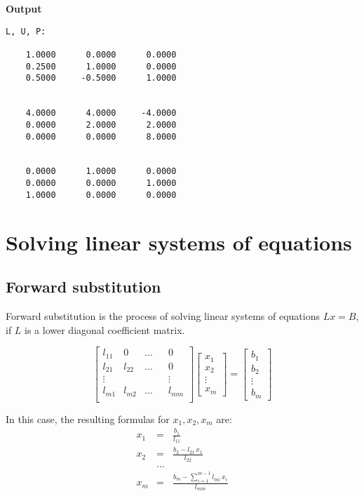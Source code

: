 \hsep
{\bf Output}
\begin{verbatim}
L, U, P:

    1.0000      0.0000      0.0000  
    0.2500      1.0000      0.0000  
    0.5000     -0.5000      1.0000  


    4.0000      4.0000     -4.0000  
    0.0000      2.0000      2.0000  
    0.0000      0.0000      8.0000  


    0.0000      1.0000      0.0000  
    0.0000      0.0000      1.0000  
    1.0000      0.0000      0.0000  
\end{verbatim}

\section{Solving linear systems of equations}

\subsection{Forward substitution}

Forward substitution is the process of solving linear systems of equations $Lx=B$, if $L$ is a lower diagonal coefficient matrix.

$$
\begin{bmatrix}
l_{11} & 0 & \ldots && 0\\
l_{21} & l_{22} & \ldots && 0\\
\vdots & & & & \vdots \\
l_{m1} & l_{m2} & \ldots && l_{mm}\\
\end{bmatrix}
\begin{bmatrix}
x_{1} \\
x_{2} \\
\vdots   \\
x_{m}
\end{bmatrix}
=
\begin{bmatrix}
b_{1} \\
b_{2} \\
\vdots \\
b_{m}
\end{bmatrix}
$$

In this case, the resulting formulas for $x_1, x_2, x_m$ are:
$$
\begin{array}{rcl}
x_{1} & = & \displaystyle \frac{b_{1}}{l_{11}} \\[4mm]
x_{2} & = & \displaystyle \frac{b_{2}-l_{21}\,x_{1}}{l_{22}} \\[2mm]
& ...&  \\
x_{m} & = & \displaystyle \frac{\displaystyle b_{m} - \sum_{i=1}^{m-1} l_{mi}\,x_{i}}{l_{mm}}
\end{array}
$$

